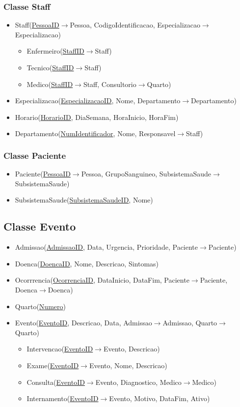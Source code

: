 \documentclass[article, a4paper, 12pt, oneside]{memoir}
\begin{document}
\subsubsection{Classe Staff}
\begin{itemize}
	\item Staff(\underline{PessoaID}$\rightarrow$Pessoa, CodigoIdentificacao, Especializacao$\rightarrow$Especializacao)
	\begin{itemize}
		\item Enfermeiro(\underline{StaffID}$\rightarrow$Staff)
		\item Tecnico(\underline{StaffID}$\rightarrow$Staff)
		\item Medico(\underline{StaffID}$\rightarrow$Staff, Consultorio$\rightarrow$Quarto)
	\end{itemize}
	\item Especializacao(\underline{EspecializacaoID}, Nome, Departamento$\rightarrow$Departamento)
	\item Horario(\underline{HorarioID}, DiaSemana, HoraInicio, HoraFim)
	\item Departamento(\underline{NumIdentificador}, Nome, Responsavel$\rightarrow$Staff)
\end{itemize}
\subsubsection{Classe Paciente}
\begin{itemize}
	\item Paciente(\underline{PessoaID}$\rightarrow$Pessoa, GrupoSanguineo, SubsistemaSaude$\rightarrow$SubsistemaSaude)
	\item SubsistemaSaude(\underline{SubsistemaSaudeID}, Nome)
\end{itemize}
\subsection{Classe Evento}
\begin{itemize}
	\item Admissao(\underline{AdmissaoID}, Data, Urgencia, Prioridade, Paciente$\rightarrow$Paciente)
	\item Doenca(\underline{DoencaID}, Nome, Descricao, Sintomas)
	\item Ocorrrencia(\underline{OcorrenciaID}, DataInicio, DataFim, Paciente$\rightarrow$Paciente, Doenca$\rightarrow$Doenca)
	\item Quarto(\underline{Numero})
	\item Evento(\underline{EventoID}, Descricao, Data, Admissao$\rightarrow$Admissao, Quarto$\rightarrow$Quarto)
	\begin{itemize}
		\item Intervencao(\underline{EventoID}$\rightarrow$Evento, Descricao)
		\item Exame(\underline{EventoID}$\rightarrow$Evento, Nome, Descricao)
		\item Consulta(\underline{EventoID}$\rightarrow$Evento, Diagnostico, Medico$\rightarrow$Medico)
		\item Internamento(\underline{EventoID}$\rightarrow$Evento, Motivo, DataFim, Ativo)
	\end{itemize}
\end{itemize}
\end{document}
